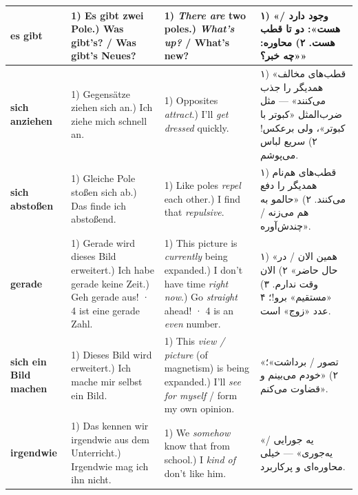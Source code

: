 \documentclass[10pt]{article}
\newcommand{\w}[1]{\textbf{#1}}
\newcounter{wn}
\begin{document}
\begin{longtable}{|L{3.4cm}|L{8.6cm}|L{6.6cm}|F{6.3cm}|}
\w{es gibt} &
1) Es gibt zwei Pole.) Was gibt’s? / Was gibt’s Neues? &
1) \emph{There are} two poles.) \emph{What’s up?} / What’s new? &
۱) «وجود دارد / هست»: دو تا قطب هست.\newline
۲) محاوره: «چه خبر؟» \\\hline

\w{sich anziehen} &
1) Gegensätze ziehen sich an.) Ich ziehe mich schnell an. &
1) Opposites \emph{attract}.) I’ll \emph{get dressed} quickly. &
۱) «قطب‌های مخالف همدیگر را جذب می‌کنند» — مثل ضرب‌المثل «کبوتر با کبوتر»، ولی برعکس!\newline
۲) سریع لباس می‌پوشم. \\\hline

\w{sich abstoßen} &
1) Gleiche Pole stoßen sich ab.) Das finde ich abstoßend. &
1) Like poles \emph{repel} each other.) I find that \emph{repulsive}. &
۱) قطب‌های هم‌نام همدیگر را دفع می‌کنند.\newline
۲) «حالمو به هم می‌زنه / چندش‌آوره». \\\hline

\w{gerade} &
1) Gerade wird dieses Bild erweitert.) Ich habe gerade keine Zeit.) Geh gerade aus! · 4 ist eine gerade Zahl. &
1) This picture is \emph{currently} being expanded.) I don’t have time \emph{right now}.) Go \emph{straight} ahead! · 4 is an \emph{even} number. &
۱) «همین الان / در حال حاضر»\newline
۲) الان وقت ندارم.\newline
۳) «مستقیم» برو!؛ ۴ عدد «زوج» است. \\\hline

\w{sich ein Bild machen} &
1) Dieses Bild wird erweitert.) Ich mache mir selbst ein Bild. &
1) This \emph{view / picture} (of magnetism) is being expanded.) I’ll \emph{see for myself} / form my own opinion. &
«تصور / برداشت»؛ ۲) «خودم می‌بینم و قضاوت می‌کنم». \\\hline

\w{irgendwie} &
1) Das kennen wir irgendwie aus dem Unterricht.) Irgendwie mag ich ihn nicht. &
1) We \emph{somehow} know that from school.) I \emph{kind of} don’t like him. &
«یه جورایی / یه‌جوری» — خیلی محاوره‌ای و پرکاربرد. \\\hline


\end{longtable}
\end{document}
